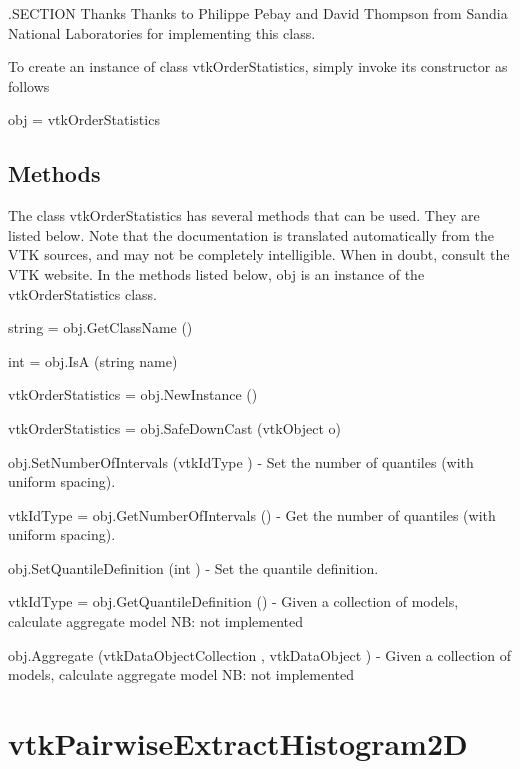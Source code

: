 .S\-E\-C\-T\-I\-O\-N Thanks Thanks to Philippe Pebay and David Thompson from Sandia National Laboratories for implementing this class.

To create an instance of class vtk\-Order\-Statistics, simply invoke its constructor as follows \begin{DoxyVerb}  obj = vtkOrderStatistics
\end{DoxyVerb}
 \hypertarget{vtkwidgets_vtkxyplotwidget_Methods}{}\subsection{Methods}\label{vtkwidgets_vtkxyplotwidget_Methods}
The class vtk\-Order\-Statistics has several methods that can be used. They are listed below. Note that the documentation is translated automatically from the V\-T\-K sources, and may not be completely intelligible. When in doubt, consult the V\-T\-K website. In the methods listed below, {\ttfamily obj} is an instance of the vtk\-Order\-Statistics class. 
\begin{DoxyItemize}
\item {\ttfamily string = obj.\-Get\-Class\-Name ()}  
\item {\ttfamily int = obj.\-Is\-A (string name)}  
\item {\ttfamily vtk\-Order\-Statistics = obj.\-New\-Instance ()}  
\item {\ttfamily vtk\-Order\-Statistics = obj.\-Safe\-Down\-Cast (vtk\-Object o)}  
\item {\ttfamily obj.\-Set\-Number\-Of\-Intervals (vtk\-Id\-Type )} -\/ Set the number of quantiles (with uniform spacing).  
\item {\ttfamily vtk\-Id\-Type = obj.\-Get\-Number\-Of\-Intervals ()} -\/ Get the number of quantiles (with uniform spacing).  
\item {\ttfamily obj.\-Set\-Quantile\-Definition (int )} -\/ Set the quantile definition.  
\item {\ttfamily vtk\-Id\-Type = obj.\-Get\-Quantile\-Definition ()} -\/ Given a collection of models, calculate aggregate model N\-B\-: not implemented  
\item {\ttfamily obj.\-Aggregate (vtk\-Data\-Object\-Collection , vtk\-Data\-Object )} -\/ Given a collection of models, calculate aggregate model N\-B\-: not implemented  
\end{DoxyItemize}\hypertarget{vtkinfovis_vtkpairwiseextracthistogram2d}{}\section{vtk\-Pairwise\-Extract\-Histogram2\-D}\label{vtkinfovis_vtkpairwiseextracthistogram2d}
